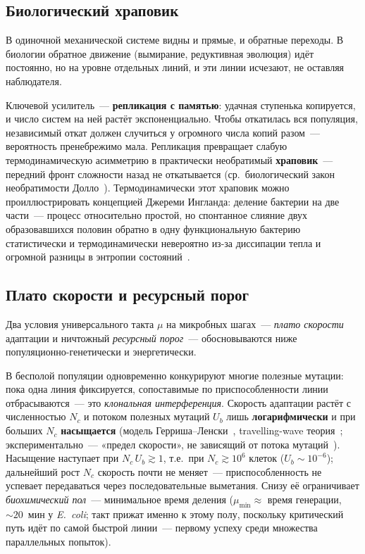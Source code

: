 \documentclass[12pt,a4paper]{article}
\begin{document}
\subsection{Биологический храповик}
\label{sec:ratchet}

В одиночной механической системе видны и прямые, и обратные переходы. В биологии обратное движение (вымирание, редуктивная эволюция) идёт постоянно, но на уровне отдельных линий, и эти линии исчезают, не оставляя наблюдателя.

Ключевой усилитель~--- \textbf{репликация с памятью}: удачная ступенька копируется, и число систем на ней растёт экспоненциально. Чтобы откатилась вся популяция, независимый откат должен случиться у огромного числа копий разом~--- вероятность пренебрежимо мала. Репликация превращает слабую термодинамическую асимметрию в практически необратимый \textbf{храповик}~--- передний фронт сложности назад не откатывается (ср.~биологический закон необратимости Долло~\cite{Dollo1893,Gould1970}). Термодинамически этот храповик можно проиллюстрировать концепцией Джереми Ингланда: деление бактерии на две части~--- процесс относительно простой, но спонтанное слияние двух образовавшихся половин обратно в одну функциональную бактерию статистически и термодинамически невероятно из-за диссипации тепла и огромной разницы в энтропии состояний~\cite{England2013}.

\subsection{Плато скорости и ресурсный порог}
\label{sec:resource_threshold}

Два условия универсального такта $\mu$ на микробных шагах~--- \emph{плато скорости} адаптации и ничтожный \emph{ресурсный порог}~--- обосновываются ниже популяционно-генетически и энергетически.

В бесполой популяции одновременно конкурируют многие полезные мутации: пока одна линия фиксируется, сопоставимые по приспособленности линии отбрасываются~--- это \emph{клональная интерференция}. Скорость адаптации растёт с численностью $N_c$ и потоком полезных мутаций $U_b$ лишь \textbf{логарифмически} и при больших $N_c$ \textbf{насыщается} (модель Герриша--Ленски~\cite{GerrishLenski1998}, travelling-wave теория~\cite{DesaiFisher2007,ParkKrug2007}; экспериментально~--- «предел скорости», не зависящий от потока мутаций~\cite{deVisser1999,Lang2013}). Насыщение наступает при $N_c\,U_b \gtrsim 1$, т.е.\ при $N_c \gtrsim 10^{6}$ клеток ($U_b \sim 10^{-6}$); дальнейший рост $N_c$ скорость почти не меняет~--- приспособленность не успевает передаваться через последовательные выметания. Снизу её ограничивает \emph{биохимический пол}~--- минимальное время деления ($\mu_{\min}\approx$ время генерации, $\sim 20$~мин у \emph{E.~coli}; такт прижат именно к этому полу, поскольку критический путь идёт по самой быстрой линии~--- первому успеху среди множества параллельных попыток).
\end{document}
